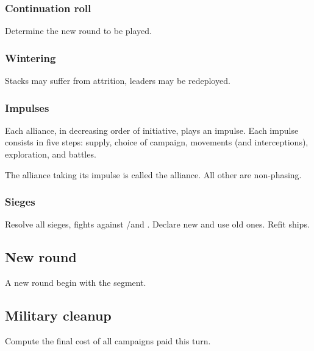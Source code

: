 \subsubsection{Continuation roll}
Determine the new round to be played.

\subsubsection{Wintering}
Stacks may suffer from attrition, leaders may be redeployed.

\subsubsection{Impulses}
Each alliance, in decreasing order of initiative, plays an impulse. Each
impulse consists in five steps: supply, choice of campaign, movements (and
interceptions), exploration, and battles.

The alliance taking its impulse is called the  alliance. All
other are non-phasing.

\subsubsection{Sieges}
Resolve all sieges, fights against \REVOLT/\REBELLION and \corsaire. Declare
new  and use old ones. Refit  ships.

\subsection{New round}
A new round begin with the  segment.

\subsection{Military cleanup}
Compute the final cost of all campaigns paid this turn.

